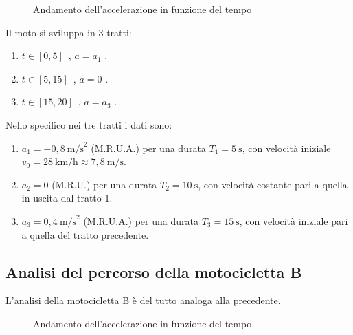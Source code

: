 \documentclass[a4paper,11pt]{article}
\begin{document}
\begin{figure}[h]
\centering
{}
\caption{Andamento dell’accelerazione in funzione del tempo}
\label{fig:acc}
\end{figure}

Il moto si sviluppa in 3 tratti:
\begin{enumerate}
\item  $t \in [0,5]$\ , \quad $a = a_1$ \quad {}.
\item  $t \in [5,15]$\ , \quad $a = 0$ \quad {}. 
\item  $t \in [15,20]$\ , \quad $a = a_3$ \quad {}.
\end{enumerate}
Nello specifico nei tre tratti i dati sono: 
\begin{enumerate}
\item $a_1 = -0{,}8\ \text{m/s}^2$ (M.R.U.A.) per una durata $T_1 = 5\ \text{s}$, con velocità iniziale $v_0 = 28\ \text{km/h} \approx 7{,}8\ \text{m/s}$.

\item $a_2 = 0$ (M.R.U.) per una durata $T_2 = 10\ \text{s}$,  
      con velocità costante pari a quella in uscita dal tratto 1.

\item $a_3 = 0{,}4\ \text{m/s}^2$ (M.R.U.A.) per una durata $T_3 = 15\ \text{s}$, con velocità iniziale pari a quella del tratto precedente.
\end{enumerate}
\newpage

\subsection{Analisi del percorso della motocicletta B}
L'analisi della motocicletta B è del tutto analoga alla precedente.
\begin{figure}[h]
\centering
{}
\caption{Andamento dell’accelerazione in funzione del tempo}
\label{fig:acc2}
\end{figure}
\end{document}
